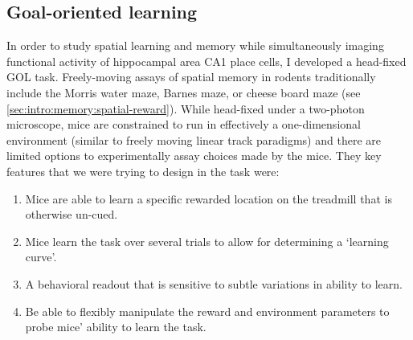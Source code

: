 \subsection{Goal-oriented learning}
\label{sec:intro:techniques:GOL}
In order to study spatial learning and memory while simultaneously imaging functional activity of hippocampal area CA1 place cells, I developed a head-fixed \ac{GOL} task.
Freely-moving assays of spatial memory in rodents traditionally include the Morris water maze, Barnes maze, or cheese board maze (see \autoref{sec:intro:memory:spatial-reward}).
While head-fixed under a two-photon microscope, mice are constrained to run in effectively a one-dimensional environment (similar to freely moving linear track paradigms) and there are limited options to experimentally assay choices made by the mice.
They key features that we were trying to design in the task were:
\begin{enumerate}
	\item Mice are able to learn a specific rewarded location on the treadmill that is otherwise un-cued.\label{item:into:techniques:GOL:location}
	\item Mice learn the task over several trials to allow for determining a `learning curve'.\label{item:into:techniques:GOL:learning}
	\item A behavioral readout that is sensitive to subtle variations in ability to learn.\label{item:into:techniques:GOL:readout}
	\item Be able to flexibly manipulate the reward and environment parameters to probe mice' ability to learn the task.\label{item:into:techniques:GOL:manip}
\end{enumerate}

